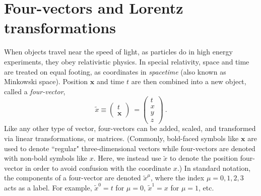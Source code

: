 \section{Four-vectors and Lorentz transformations}
When objects travel near the speed of light, as particles do in high energy experiments, they obey relativistic physics. In special relativity, space and time are treated on equal footing, as coordinates in {\it spacetime} (also known as Minkowski space). Position $\mathbf{x}$ and time $t$ are then combined into a new object, called a {\it four-vector},
\begin{equation}
    \tilde x \equiv \begin{pmatrix}
        t \\
        \mathbf{x}
    \end{pmatrix}\
    =\begin{pmatrix}
        t \\
        x \\
        y \\
        z
    \end{pmatrix}\ . \label{eqn.xmu}
\end{equation}
Like any other type of vector, four-vectors can be added, scaled, and transformed via linear transformations, or matrices. (Commonly, bold-faced symbols like $\mathbf{x}$ are used to denote ``regular" three-dimensional vectors while four-vectors are denoted with non-bold symbols like $x$. Here, we instead use $\tilde{x}$ to denote the position four-vector in order to avoid confusion with the coordinate $x$.) In standard notation, the components of a four-vector are denoted $\tilde x^\mu$, where the index $\mu=0,1,2,3$ acts as a label. For example, $\tilde{x}^0=t$ for $\mu=0$, $\tilde{x}^1=x$ for $\mu=1$, etc.

